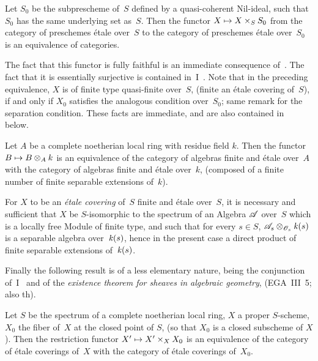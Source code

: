 \begin{proposition}
\label{IX.1.7}
Let $S_0$ be the subprescheme of~$S$ defined by a quasi-coherent
Nil-ideal, \ie such that $S_0$ has the same
underlying set as~$S$. Then the functor $X \mto X\times_S
S_0$ from the category of preschemes \'etale over~$S$
to the category of preschemes \'etale over~$S_0$ is
an equivalence of categories.
\end{proposition}

The fact that this functor is fully faithful is an
immediate consequence of~. The fact that it is
essentially surjective is contained in~I~. Note
that in the preceding equivalence,
$X$ is of finite type \ie quasi-finite over~$S$, (\resp finite \ie an \'etale covering
of~$S$), if and only if $X_0$ satisfies the analogous condition
over~$S_0$; same remark for the separation condition. These facts
are immediate, and are also contained in~ below.

\begin{corollary}
\label{IX.1.8}
Let $A$ be a complete noetherian local ring with residue field
$k$. Then the functor $B \mto B\otimes_A k$ is an
equivalence of the category of algebras finite and
\'etale over~$A$ with the category of algebras finite and
\'etale over~$k$, (\ie composed of a finite number of
finite separable extensions of~$k$).
\end{corollary}

\begin{proposition}
\label{IX.1.9}
For $X$ to be an \emph{\'etale covering} of~$S$ \ie finite
and \'etale over~$S$, it is necessary and sufficient that $X$ be
$S$-isomorphic to the spectrum of an Algebra $\cal{A}$ over~$S$
which is a locally free Module of finite type, and such that for
every
$s \in S$, $\cal{A}_s\otimes_{\cal{O}_s}\kres(s)$ is a separable
algebra over~$\mathit{k}(s)$, hence in the present case a direct product
of finite separable extensions of~$\mathit{k}(s)$.
\end{proposition}

Finally the following result is of a less elementary nature,
being the conjunction of~I~ and of the
\emph{existence theorem for sheaves in algebraic geometry},
(EGA~III~5; \cf also \cite{IX.1} th).

\begin{theorem}
\label{IX.1.10}
Let $S$ be the spectrum of a complete noetherian local ring, $X$ a
proper $S$-scheme, $X_0$ the fiber of~$X$ at the closed point of
$S$, (so that $X_0$ is a closed subscheme of
$X$). Then the restriction functor $X' \mto X'\times_X X_0$ is
an equivalence of the category of \'etale coverings
of~$X$ with the category of \'etale coverings of~$X_0$.
\end{theorem}


